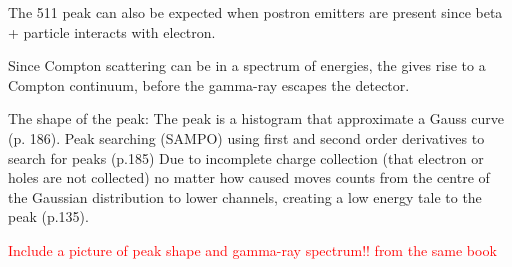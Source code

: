The 511 peak can also be expected when postron emitters are present since beta + particle interacts with electron.  

Since Compton scattering can be in a spectrum of energies, the gives rise to a Compton continuum, before the gamma-ray escapes the detector. 


The shape of the peak: The peak is a histogram that approximate a Gauss curve (p. 186). Peak searching (SAMPO) using first and second order derivatives to search for peaks (p.185)
Due to incomplete charge collection (that electron or holes are not collected) no matter how caused moves counts from the centre of the Gaussian distribution to lower channels, creating a low energy tale to the peak (p.135).  

\textcolor{red}{Include a picture of peak shape and gamma-ray spectrum!! from the same book}
